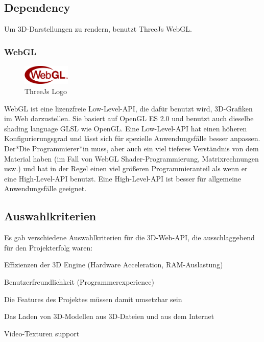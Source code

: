 \subsection{Dependency}
\label{ch::ThreeJsDependency}
Um 3D-Darstellungen zu rendern, benutzt ThreeJs WebGL.

\subsubsection{WebGL}
\label{ch::webgl}
\begin{figure}
    \begin{center}
      \includegraphics[width=0.2\textwidth]{pics/WebGL_Logo.png}
     \caption{ThreeJs Logo}
    \end{center}
\end{figure}
WebGL ist eine lizenzfreie Low-Level-API, die dafür benutzt wird, 3D-Grafiken im Web darzustellen. Sie basiert auf OpenGL ES 2.0 und benutzt auch dieselbe shading language GLSL wie OpenGL. Eine Low-Level-API hat einen höheren Konfigurierungsgrad und lässt sich für spezielle Anwendungsfälle besser anpassen. Der*Die Programmierer*in muss, aber auch ein viel tieferes Verständnis von dem Material haben (im Fall von WebGL Shader-Programmierung, Matrixrechnungen usw.) und hat in der Regel einen viel größeren Programmieranteil als wenn er eine High-Level-API benutzt. Eine High-Level-API  ist besser für allgemeine Anwendungsfälle geeignet.
\cite[WebGl Getting Started]{WebglGettingStarted} \cite{HighlowAPI}


\subsection{Auswahlkriterien}
Es gab verschiedene Auswahlkriterien für die 3D-Web-API, die ausschlaggebend für den Projekterfolg waren:
\begin{compactitem}
  \item Effizienzen der 3D Engine (Hardware Acceleration, RAM-Auslastung)
  \item Benutzerfreundlichkeit (Programmerexperience)
  \item Die Features des Projektes müssen damit umsetzbar sein
  \begin{compactenum}
    \item Das Laden von 3D-Modellen aus 3D-Dateien und aus dem Internet
    \item Video-Texturen support
  \end{compactenum}
\end{compactitem}

